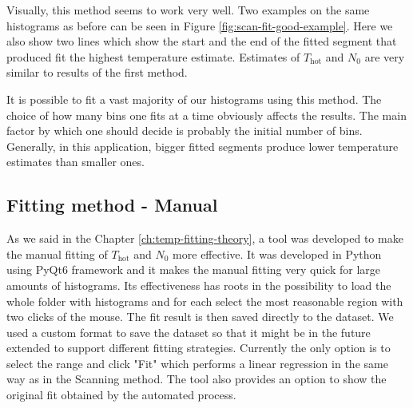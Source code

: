 Visually, this method seems to work very well. Two examples on the same histograms as before can be seen in Figure \ref{fig:scan-fit-good-example}. Here we also show two lines which show the start and the end of the fitted segment that produced fit the highest temperature estimate. Estimates of $T_\mathrm{hot}$ and $N_0$ are very similar to results of the first method.

It is possible to fit a vast majority of our histograms using this method. The choice of how many bins one fits at a time obviously affects the results. The main factor by which one should decide is probably the initial number of bins. Generally, in this application, bigger fitted segments produce lower temperature estimates than smaller ones.

\subsection*{Fitting method - Manual}
As we said in the Chapter \ref{ch:temp-fitting-theory}, a tool was developed to make the manual fitting of $T_{\mathrm{hot}}$ and $N_0$ more effective. It was developed in Python using PyQt6 framework and it makes the manual fitting very quick for large amounts of histograms. Its effectiveness has roots in the possibility to load the whole folder with histograms and for each select the most reasonable region with two clicks of the mouse. The fit result is then saved directly to the dataset. We used a custom format to save the dataset so that it might be in the future extended to support different fitting strategies. Currently the only option is to select the range and click "Fit" which performs a linear regression in the same way as in the Scanning method. The tool also provides an option to show the original fit obtained by the automated process. 

